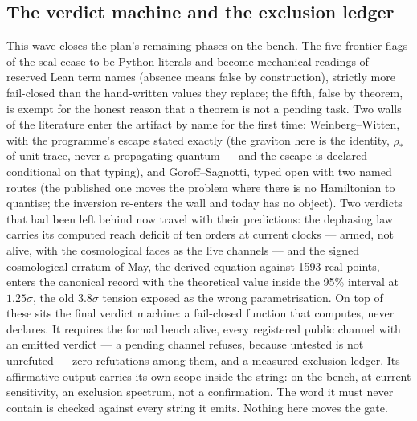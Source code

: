 \documentclass[11pt]{article}
\theoremstyle{definition}\newtheorem{deriv}{Derivation}
\begin{document}
\subsection*{The verdict machine and the exclusion ledger}This wave closes the plan's remaining phases on the bench. The five frontier flags of the seal cease to be Python literals and become mechanical readings of reserved Lean term names (absence means false by construction), strictly more fail-closed than the hand-written values they replace; the fifth, false by theorem, is exempt for the honest reason that a theorem is not a pending task. Two walls of the literature enter the artifact by name for the first time: Weinberg--Witten, with the programme's escape stated exactly (the graviton here is the identity, $\rho_\ast$ of unit trace, never a propagating quantum --- and the escape is declared conditional on that typing), and Goroff--Sagnotti, typed open with two named routes (the published one moves the problem where there is no Hamiltonian to quantise; the inversion re-enters the wall and today has no object). Two verdicts that had been left behind now travel with their predictions: the dephasing law carries its computed reach deficit of ten orders at current clocks --- armed, not alive, with the cosmological faces as the live channels --- and the signed cosmological erratum of May, the derived equation against 1593 real points, enters the canonical record with the theoretical value inside the 95\% interval at $1.25\sigma$, the old $3.8\sigma$ tension exposed as the wrong parametrisation. On top of these sits the final verdict machine: a fail-closed function that computes, never declares. It requires the formal bench alive, every registered public channel with an emitted verdict --- a pending channel refuses, because untested is not unrefuted --- zero refutations among them, and a measured exclusion ledger. Its affirmative output carries its own scope inside the string: on the bench, at current sensitivity, an exclusion spectrum, not a confirmation. The word it must never contain is checked against every string it emits. Nothing here moves the gate.
\end{document}
